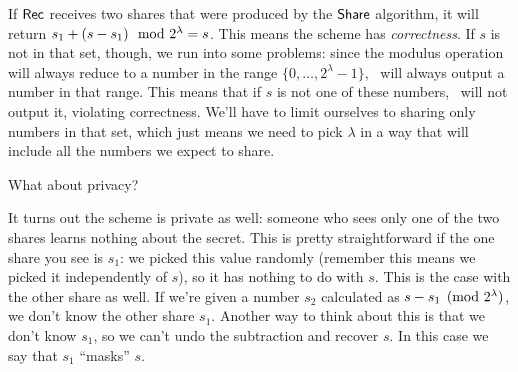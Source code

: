 If $\mathsf{Rec}$ receives two shares that were produced by the $\mathsf{Share}$ algorithm, 
it will return $s_1 + (s-s_1) \mod 2^\lambda = s$. This means the scheme 
has \emph{correctness}. If $s$ is not in that set, though, we run into some 
problems: since the modulus operation will always reduce to a number 
in the range $\{0, \ldots, 2^\lambda-1\}$, \rec~will always output a number 
in that range. This means that if $s$ is not one of these numbers, 
\rec~will not output it, violating correctness. We'll have to limit ourselves 
to sharing only numbers in that set, which just means we need to pick 
$\lambda$ in a way that will include all the numbers we expect to share.

What about privacy? 

It turns out the scheme is private as well: someone who sees only one of the two 
shares learns nothing about the secret. This is pretty straightforward if the 
one share you see is $s_1$: we picked this value randomly (remember this means 
we picked it independently of $s$), so it has nothing to do with $s$. This 
is the case with the other share as well. If we're given a number $s_2$ 
calculated as $s-s_1 \pmod{2^\lambda}$, we don't know the other share 
$s_1$. 
Another way to think about this 
is that we don't know $s_1$, so we can't undo the subtraction and recover $s$.
In this case we say that $s_1$ ``masks'' $s$.



